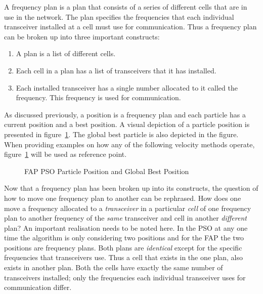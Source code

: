 A frequency plan is a plan that consists of a series of different cells that are in use in the network. The plan specifies the frequencies that each individual transceiver installed at a cell must use for communication. Thus a frequency plan can be broken up into three important constructs:
\begin{enumerate}
\item A plan is a list of different cells.
\item Each cell in a plan has a list of transceivers that it has installed.
\item Each installed transceiver has a single number allocated to it called the frequency. This frequency is used for communication.
\end{enumerate}

As discussed previously, a position is a frequency plan and each particle has a current position and a best position. A visual depiction of a particle position is presented in figure~\ref{fig:fapparticlepos}. The global best particle is also depicted in the figure. When providing examples on how any of the following velocity methods operate, figure~\ref{fig:fapparticlepos} will be used as reference point.
\begin{figure}[ht]
	\centering
	\setlength \fboxsep{0pt}
	\setlength \fboxrule{0.5pt}
	\caption{FAP PSO Particle Position and Global Best Position}
	\label{fig:fapparticlepos}
\end{figure}

Now that a frequency plan has been broken up into its constructs, the question of how to move one frequency plan to another can be rephrased. How does one move a frequency allocated to a \emph{transceiver} in a particular \emph{cell} of one frequency plan to another frequency of the \emph{same} transceiver and cell in another \emph{different} plan? An important realisation needs to be noted here. In the \gls{PSO} at any one time the algorithm is only considering two positions and for the \gls{FAP} the two positions are frequency plans. Both plans are \emph{identical} except for the specific frequencies that transceivers use. Thus a cell that exists in the one plan, also exists in another plan. Both the cells have exactly the same number of transceivers installed; only the frequencies each individual transceiver uses for communication differ.

